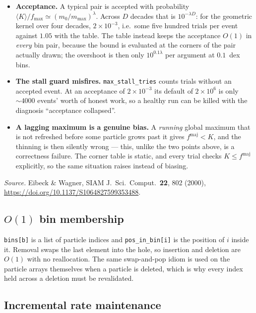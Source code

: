 \documentclass[a4paper,12pt]{article}
\newcommand{\fmaj}{f^{\mathrm{maj}}}
\newcommand{\code}[1]{\texttt{#1}}
\begin{document}
\begin{itemize}
  \item \textbf{Acceptance.} A typical pair is accepted with probability
        $\langle K\rangle/f_{\max} \simeq (m_0/m_{\max})^{\lambda}$. Across
        $D$ decades that is $10^{-\lambda D}$: for the geometric kernel over
        four decades, $2\times10^{-3}$, i.e.\ some five hundred trials per
        event against $1.05$ with the table. The table instead keeps the
        acceptance $O(1)$ in \emph{every} bin pair, because the bound is
        evaluated at the corners of the pair actually drawn; the overshoot is
        then only $10^{0.1\lambda}$ per argument at $0.1$~dex bins.
  \item \textbf{The stall guard misfires.} \code{max\_stall\_tries} counts
        trials without an accepted event. At an acceptance of
        $2\times10^{-3}$ its default of $2\times10^{6}$ is only
        $\sim\!4000$ events' worth of honest work, so a healthy run can be
        killed with the diagnosis ``acceptance collapsed''.
  \item \textbf{A lagging maximum is a genuine bias.} A \emph{running} global
        maximum that is not refreshed before some particle grows past it
        gives $\fmaj < K$, and the thinning is then silently wrong --- this,
        unlike the two points above, is a correctness failure. The corner
        table is static, and every trial checks $K \le \fmaj$ explicitly, so
        the same situation raises instead of biasing.
\end{itemize}

\emph{Source.} Eibeck \& Wagner, SIAM J.~Sci.\ Comput.\ \textbf{22}, 802
(2000),
\url{https://doi.org/10.1137/S1064827599353488}.

\subsection{$O(1)$ bin membership}
\label{sec:trick3}

\code{bins[b]} is a list of particle indices and \code{pos\_in\_bin[i]} is
the position of $i$ inside it. Removal swaps the last element into the hole,
so insertion and deletion are $O(1)$ with no reallocation. The same
swap-and-pop idiom is used on the particle arrays themselves when a particle
is deleted, which is why every index held across a deletion must be
revalidated.

\subsection{Incremental rate maintenance}
\label{sec:trick4}
\end{document}
